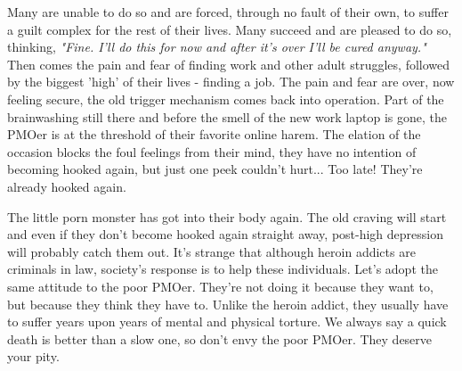 \documentclass[easypeasy.tex]{subfiles}
\begin{document}
Many are unable to do so and are forced, through no fault of their own, to suffer a guilt complex for the rest of their lives. Many succeed and are pleased to do so, thinking, \textit{"Fine. I'll do this for now and after it's over I'll be cured anyway."} Then comes the pain and fear of finding work and other adult struggles, followed by the biggest 'high' of their lives - finding a job. The pain and fear are over, now feeling secure, the old trigger mechanism comes back into operation. Part of the brainwashing still there and before the smell of the new work laptop is gone, the PMOer is at the threshold of their favorite online harem. The elation of the occasion blocks the foul feelings from their mind, they have no intention of becoming hooked again, but just one peek couldn't hurt... Too late! They're already hooked again.

The little porn monster has got into their body again. The old craving will start and even if they don't become hooked again straight away, post-high depression will probably catch them out. It's strange that although heroin addicts are criminals in law, society's response is to help these individuals. Let's adopt the same attitude to the poor PMOer. They're not doing it because they want to, but because they think they have to. Unlike the heroin addict, they usually have to suffer years upon years of mental and physical torture. We always say a quick death is better than a slow one, so don't envy the poor PMOer. They deserve your pity.
\end{document}
